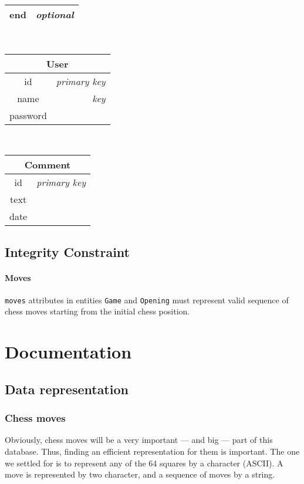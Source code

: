 \documentclass{article}
\begin{document}
\begin{table}[ht!]
\begin{subtable}{3.5cm}
\begin{tabular}[t]{|cr|}
	end    & \em{optional}    \\
	\hline
	\end{tabular}
    \end{subtable}
    ~
    \begin{subtable}{3.5cm}
	\begin{tabular}[t]{|cr|}
	\hline
	\multicolumn{2}{|c|}{\textbf{User}} \\
	\hline
	id       & \em{primary key} \\
	name     & \em{key}         \\
	password &                  \\
	\hline
	\end{tabular}
    \end{subtable}
    ~
    \begin{subtable}{3.5cm}
	\begin{tabular}[t]{|cr|}
	\hline
	\multicolumn{2}{|c|}{\textbf{Comment}} \\
	\hline
	id     & \em{primary key} \\
	text   &                  \\
	date   &                  \\
	\hline
	\end{tabular}
    \end{subtable}
\end{table}


\subsection{Integrity Constraint}
\paragraph{Moves}
\verb|moves| attributes in entities \verb|Game| and \verb|Opening| must represent
valid sequence of chess moves starting from the initial chess position.


\section{Documentation}
\subsection{Data representation}
\subsubsection{Chess moves}
Obviously, chess moves will be a very important --- and big --- part of this database.
Thus, finding an efficient representation for them is important.
The one we settled for is to represent any of the 64 squares by a character (ASCII).
A move is represented by two character, and a sequence of moves by a string.
\end{document}

